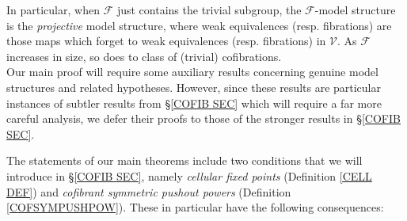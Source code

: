 \documentclass[a4paper,10pt
,draft
]{article}%
\numberwithin{equation}{section}
\numberwithin{figure}{section}
\theoremstyle{definition} %
\newtheorem{remark}[equation]{Remark}%
\newcommand{\F}{\ensuremath{\mathcal F}}
\newcommand{\V}{\ensuremath{\mathcal V}}
\newcommand{\1}{\ensuremath{\mathbbm 1}}%
\begin{document}
In particular, when $\F$ just contains the trivial subgroup,
the $\F$-model structure is the \textit{projective} model structure, where weak equivalences (resp. fibrations) are those maps which forget to weak equivalences (resp. fibrations) in $\V$.
As $\F$ increases in size, so does to class of (trivial) cofibrations.\\

Our main proof will require some auxiliary results concerning genuine model structures and related hypotheses.
However, since these results are particular instances of subtler results from \S \ref{COFIB SEC}
which will require a far more careful analysis,
we defer their %
proofs to those
of the stronger results in \S \ref{COFIB SEC}.






The statements of our main theorems include two conditions that we will introduce in \S \ref{COFIB SEC},
namely \textit{cellular fixed points} (Definition \ref{CELL DEF}) and
\textit{cofibrant symmetric pushout powers} (Definition \ref{COFSYMPUSHPOW}).
These in particular have the following consequences:
\end{document}
